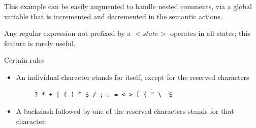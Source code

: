 \documentclass[8pt, a4paper, oneside, twocolumn]{extarticle}
\begin{document}
This example can be easily augmented to handle nested comments, via a 
global variable that is incremented and decremented in the semantic actions. 

Any regular expression not prefixed by a $<state>$ operates in all states; this  
feature is rarely useful. 

Certain rules
\begin{itemize}
    \item     An individual character stands for itself, except for the reserved characters 
    \begin{verbatim}
     ? * + | ( ) ^ $ / ; . = < > [ { " \  $

    \end{verbatim}

    \item A backslash followed by one of the reserved characters stands for that character. 


\end{itemize}
\end{document}
